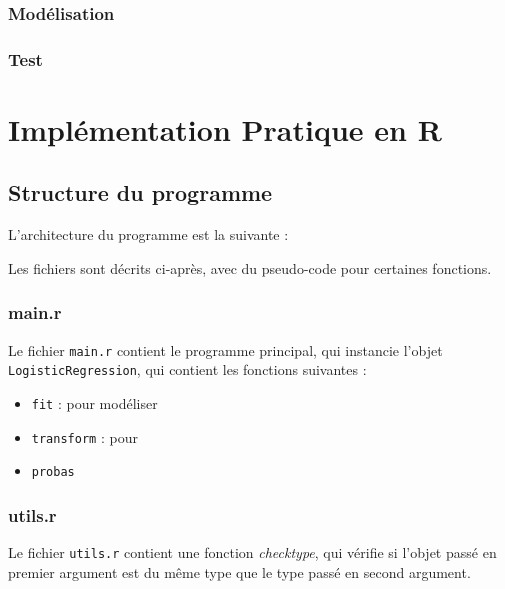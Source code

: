 \documentclass[10pt,french]{report}
\begin{document}
	\subsection{Modélisation}

	\subsection{Test}

	\chapter{Implémentation Pratique en R}

	\section{Structure du programme}

	L'architecture du programme est la suivante :


	Les fichiers sont décrits ci-après, avec du pseudo-code pour certaines fonctions.

	\subsection{main.r}

	Le fichier \texttt{main.r} contient le programme principal, qui instancie l'objet \texttt{LogisticRegression}, qui contient les fonctions suivantes :

	\begin{itemize}
		\item \texttt{fit} : pour modéliser
		\item \texttt{transform} : pour
		\item \texttt{probas}
	\end{itemize}

	\subsection{utils.r}

	Le fichier \texttt{utils.r} contient une fonction \textit{check\textunderscore type}, qui vérifie si l'objet passé en premier argument est du même type que le type passé en second argument.
\end{document}
